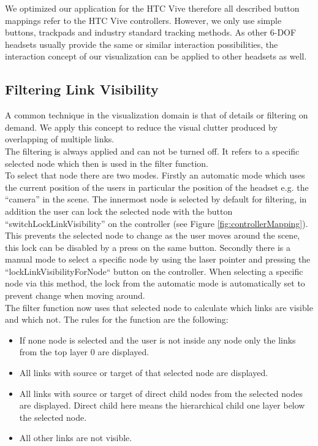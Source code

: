 We optimized our application for the HTC Vive therefore all described button mappings refer to the HTC Vive controllers. However, we only use simple buttons, trackpads and industry standard tracking methods. 
As other 6-DOF headsets usually provide the same or similar interaction possibilities, the interaction concept of our visualization can be applied to other headsets as well.\\

\subsection{Filtering Link Visibility}
\label{chap:ps-filterLinks}
A common technique in the visualization domain is that of details or filtering on demand. We apply this concept to reduce the visual clutter produced by overlapping of multiple links.\\
The filtering is always applied and can not be turned off. It refers to a specific selected node which then is used in the filter function.\\
To select that node there are two modes. Firstly an automatic mode which uses the current position of the users in particular the position of the headset e.g. the “camera” in the scene. 
The innermost node is selected by default for filtering, in addition the user can lock the selected node with the button “switchLockLinkVisibility” on the controller (see Figure \ref{fig:controllerMapping}). This prevents the selected node to change as the user moves around the scene, this lock can be disabled by a press on the same button.
Secondly there is a manual mode to select a specific node by using the laser pointer and pressing the “lockLinkVisibilityForNode“ button on the controller. When selecting a specific node via this method, the lock from the automatic mode is automatically set to prevent change when moving around.\\
The filter function now uses that selected node to calculate which links are visible and which not. The rules for the function are the following:
\begin{itemize}
    \item If none node is selected and the user is not inside any node only the links from the top layer 0 are displayed.
    \item All links with source or target of that selected node are displayed. 
    \item All links with source or target of direct child nodes from the selected nodes are displayed. Direct child here means the hierarchical child one layer below the selected node. 
    \item All other links are not visible.
\end{itemize}

